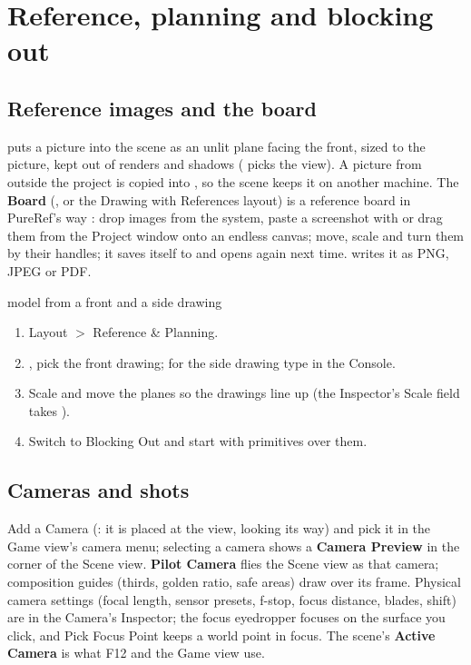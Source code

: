 \chapter{Reference, planning and blocking out}
\label{ch:plan}

\section{Reference images and the board}
 puts a picture into the scene as an unlit plane facing the front, sized to
the picture, kept out of renders and shadows ( picks the view). A picture from
outside the project is copied into , so the scene keeps it on another machine. The
\textbf{Board} (, or the Drawing with References layout) is a reference board in PureRef's way
\cite{PureRef2026}: drop images from the system, paste a screenshot with  or drag them from the Project
window onto an endless canvas; move, scale and turn them by their handles; it saves itself to  and
opens again next time.  writes it as PNG, JPEG or PDF.

\begin{example}{model from a front and a side drawing}
\begin{enumerate}
  \item Layout $>$ Reference \& Planning.
  \item {}, pick the front drawing; for the side drawing type  in the Console.
  \item Scale and move the planes so the drawings line up (the Inspector's Scale field takes ).
  \item Switch to Blocking Out and start with primitives over them.
\end{enumerate}
\end{example}

\section{Cameras and shots}
Add a Camera (: it is placed at the view, looking its way) and pick it in the Game view's
camera menu; selecting a camera shows a \textbf{Camera Preview} in the corner of the Scene view. \textbf{Pilot Camera}
flies the Scene view as that camera; composition guides (thirds, golden ratio, safe areas) draw over its frame.
Physical camera settings (focal length, sensor presets, f-stop, focus distance, blades, shift) are in the Camera's
Inspector; the focus eyedropper focuses on the surface you click, and Pick Focus Point keeps a world point in focus.
The scene's \textbf{Active Camera} is what F12 and the Game view use.


